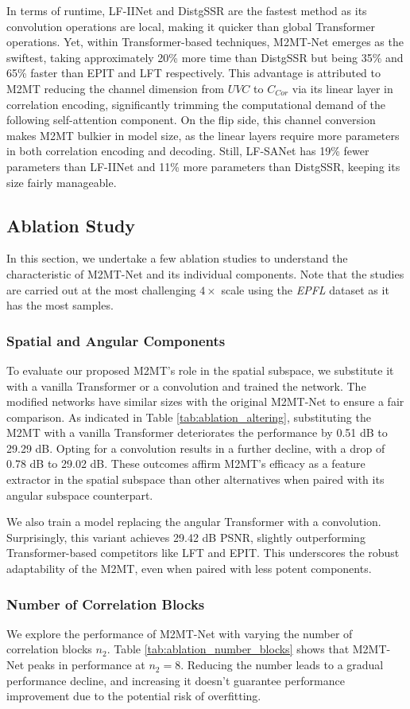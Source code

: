 In terms of runtime, LF-IINet and DistgSSR are the fastest method as its convolution operations are local, making it quicker than global Transformer operations. Yet, within Transformer-based techniques, M2MT-Net emerges as the swiftest, taking approximately 20\% more time than DistgSSR but being 35\% and 65\% faster than EPIT and LFT respectively. This advantage is attributed to M2MT reducing the channel dimension from $UVC$ to $C_{Cor}$ via its linear layer in correlation encoding, significantly trimming the computational demand of the following self-attention component. On the flip side, this channel conversion makes M2MT bulkier in model size, as the linear layers require more parameters in both correlation encoding and decoding. Still, LF-SANet has 19\% fewer parameters than LF-IINet and 11\% more parameters than DistgSSR, keeping its size fairly manageable.

\subsection{Ablation Study}
In this section, we undertake a few ablation studies to understand the characteristic of M2MT-Net and its individual components. Note that the studies are carried out at the most challenging $4 \times$ scale using the \textit{EPFL} dataset as it has the most samples.

\subsubsection{Spatial and Angular Components}
To evaluate our proposed M2MT's role in the spatial subspace, we substitute it with a vanilla Transformer or a convolution and trained the network. The modified networks have similar sizes with the original M2MT-Net to ensure a fair comparison. As indicated in Table \ref{tab:ablation_altering}, substituting the M2MT with a vanilla Transformer deteriorates the performance by 0.51 dB to 29.29 dB. Opting for a convolution results in a further decline, with a drop of 0.78 dB to 29.02 dB. These outcomes affirm M2MT's efficacy as a feature extractor in the spatial subspace than other alternatives when paired with its angular subspace counterpart.

We also train a model replacing the angular Transformer with a convolution. Surprisingly, this variant achieves 29.42 dB PSNR, slightly outperforming Transformer-based competitors like LFT and EPIT. This underscores the robust adaptability of the M2MT, even when paired with less potent components.

\subsubsection{Number of Correlation Blocks}
We explore the performance of M2MT-Net with varying the number of correlation blocks $n_2$. Table \ref{tab:ablation_number_blocks} shows that M2MT-Net peaks in performance at $n_2 = 8$. Reducing the number leads to a gradual performance decline, and increasing it doesn't guarantee performance improvement due to the potential risk of overfitting.


